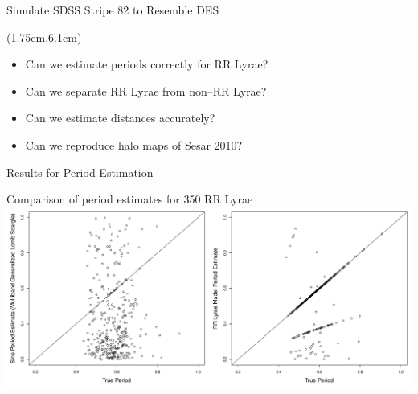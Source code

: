 \documentclass[12pt]{beamer}
\begin{document}
\begin{frame}{Simulate SDSS Stripe 82 to Resemble DES}
  \begin{textblock*}{12cm}(1.75cm,6.1cm) %
\begin{itemize}
\item Can we estimate periods correctly for RR Lyrae?
\item Can we separate RR Lyrae from non--RR Lyrae? 
\item Can we estimate distances accurately?
\item Can we reproduce halo maps of Sesar 2010?
\end{itemize}
\end{textblock*}

\end{frame}


\begin{frame}{Results for Period Estimation}



\begin{center}
Comparison of period estimates for 350 RR Lyrae\\
\includegraphics[scale=.25]{figs/period_comparison.pdf}
\end{center}



\end{frame}
\end{document}
